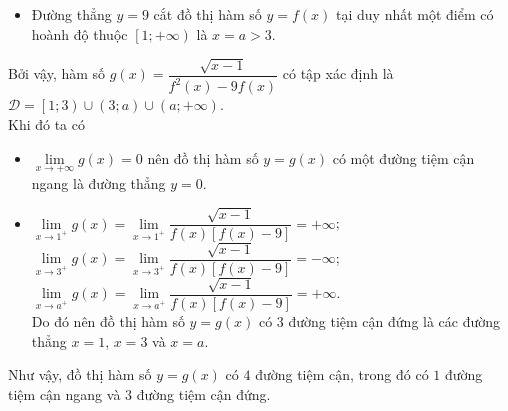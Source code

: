 \begin{ex}
{{\begin{itemize}
                \item Đường thẳng $y=9$ cắt đồ thị hàm số $y=f(x)$ tại duy nhất một điểm có hoành độ thuộc $\left[1;+\infty\right)$ là $x=a>3$.
            \end{itemize}
        }
        {}
        \noindent
        Bởi vậy, hàm số $g(x)=\dfrac{\sqrt{x-1}}{f^2(x)-9f(x)}$ có tập xác định là $\mathscr D=\left[1;3\right) \cup \left(3;a\right) \cup\left( a;+\infty\right)$.\\
        Khi đó ta có
        \begin{itemize}
            \item $\lim\limits_{x\to+\infty}g(x)=0$ nên đồ thị hàm số $y=g(x)$ có một đường tiệm cận ngang là đường thẳng $y=0$.
            \item $\lim\limits_{x\to 1^+}g(x)=\lim\limits_{x\to 1^+}\dfrac{\sqrt{x-1}}{f(x)\left[f(x)-9\right] }=+\infty$;\\
            $\lim\limits_{x\to 3^+}g(x)=\lim\limits_{x\to 3^+}\dfrac{\sqrt{x-1}}{f(x)\left[f(x)-9\right] }=-\infty$;\\
            $\lim\limits_{x\to a^+}g(x)=\lim\limits_{x\to a^+}\dfrac{\sqrt{x-1}}{f(x)\left[f(x)-9\right] }=+\infty$.\\
            Do đó nên đồ thị hàm số $y=g(x)$ có $3$ đường tiệm cận đứng là các đường thẳng $x=1$, $x=3$ và $x=a$.
        \end{itemize}
        Như vậy, đồ thị hàm số $y=g(x)$ có $4$ đường tiệm cận, trong đó có $1$ đường tiệm cận ngang và $3$ đường tiệm cận đứng.
    }
\end{ex}
